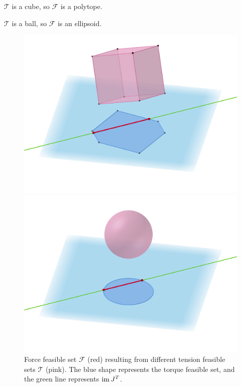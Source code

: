 \begin{minipage}{0.4\linewidth}
    \centering
    $\mathcal{T}$ is a cube, so $\mathcal{F}$ is a polytope.
\end{minipage}
\hfill
\begin{minipage}{0.4\linewidth}
    \centering
    $\mathcal{T}$ is a ball, so $\mathcal{F}$ is an ellipsoid.
\end{minipage}
\begin{figure}[!htb]
    \centering
    \captionsetup{justification=centering}
    \begin{minipage}{0.48\linewidth}
        \centering
        \includegraphics[trim={50 150 50 70}, clip, width=1\linewidth]{img/chapter_3/polytope_better_ggb.png}
    \end{minipage}
    \hfill
    \begin{minipage}{0.48\linewidth}
        \captionsetup{justification=centering}
        \centering
        \includegraphics[trim={50 150 50 70}, clip, width=1\linewidth]{img/chapter_3/polytope_from_sphere_ggb.png}
    \end{minipage}
    \caption{Force feasible set $\mathcal{F}$ (red) resulting from different tension feasible sets $\mathcal{T}$ (pink). The blue shape represents the torque feasible set, and the green line represents $\operatorname{im}{J^T}$.}
    \label{fig:tension_models_on_ffs}
\end{figure}

